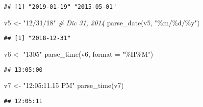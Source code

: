 \documentclass[
]{article}
\newenvironment{Shaded}{\begin{snugshade}}{\end{snugshade}}
\newcommand{\AttributeTok}[1]{\textcolor[rgb]{0.77,0.63,0.00}{#1}}
\newcommand{\CommentTok}[1]{\textcolor[rgb]{0.56,0.35,0.01}{\textit{#1}}}
\newcommand{\FunctionTok}[1]{\textcolor[rgb]{0.00,0.00,0.00}{#1}}
\newcommand{\NormalTok}[1]{#1}
\newcommand{\OtherTok}[1]{\textcolor[rgb]{0.56,0.35,0.01}{#1}}
\newcommand{\StringTok}[1]{\textcolor[rgb]{0.31,0.60,0.02}{#1}}
\begin{document}
\begin{verbatim}
## [1] "2019-01-19" "2015-05-01"
\end{verbatim}

\begin{Shaded}
\begin{Highlighting}[]
\NormalTok{v5 }\OtherTok{\textless{}{-}} \StringTok{"12/31/18"} \CommentTok{\# Dic 31, 2014}
\FunctionTok{parse\_date}\NormalTok{(v5, }\StringTok{"\%m/\%d/\%y"}\NormalTok{)}
\end{Highlighting}
\end{Shaded}

\begin{verbatim}
## [1] "2018-12-31"
\end{verbatim}

\begin{Shaded}
\begin{Highlighting}[]
\NormalTok{v6 }\OtherTok{\textless{}{-}} \StringTok{"1305"}
\FunctionTok{parse\_time}\NormalTok{(v6, }\AttributeTok{format =} \StringTok{"\%H\%M"}\NormalTok{)}
\end{Highlighting}
\end{Shaded}

\begin{verbatim}
## 13:05:00
\end{verbatim}

\begin{Shaded}
\begin{Highlighting}[]
\NormalTok{v7 }\OtherTok{\textless{}{-}} \StringTok{"12:05:11.15 PM"}
\FunctionTok{parse\_time}\NormalTok{(v7)}
\end{Highlighting}
\end{Shaded}

\begin{verbatim}
## 12:05:11
\end{verbatim}
\end{document}

